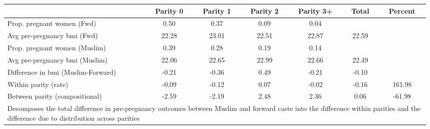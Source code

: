 \begin{tabular}{l*{6}{c}}
\toprule
            &\multicolumn{1}{c}{Parity 0}&\multicolumn{1}{c}{Parity 1}&\multicolumn{1}{c}{Parity 2}&\multicolumn{1}{c}{Parity 3+}&\multicolumn{1}{c}{Total}&\multicolumn{1}{c}{Percent}\\
\midrule
\midrule
Prop. pregnant women (Fwd)&        0.50&        0.37&        0.09&        0.04&            &            \\
Avg pre-pregnancy bmi (Fwd)&       22.28&       23.01&       22.51&       22.87&       22.59&            \\
Prop. pregnant women (Muslim)&        0.39&        0.28&        0.19&        0.14&            &            \\
Avg pre-pregnancy bmi (Muslim)&       22.06&       22.65&       22.99&       22.66&       22.49&            \\
Difference in bmi (Muslim-Forward)&       -0.21&       -0.36&        0.49&       -0.21&       -0.10&            \\
Within parity (rate)&       -0.09&       -0.12&        0.07&       -0.02&       -0.16&      161.98\\
Between parity (compositional)&       -2.59&       -2.19&        2.48&        2.36&        0.06&      -61.98\\
\bottomrule
\multicolumn{7}{l}{\footnotesize Decomposes the total difference in pre-pregnancy outcomes between Muslim and forward caste into the difference within parities and the difference due to distribution across parities}\\
\end{tabular}
